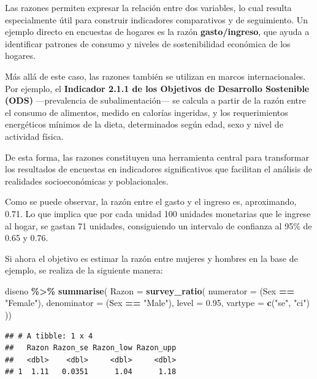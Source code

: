 \documentclass[
  spanish,
  12pt,
]{book}
\newenvironment{Shaded}{\begin{snugshade}}{\end{snugshade}}
\newcommand{\AttributeTok}[1]{\textcolor[rgb]{0.13,0.29,0.53}{#1}}
\newcommand{\FloatTok}[1]{\textcolor[rgb]{0.00,0.00,0.81}{#1}}
\newcommand{\FunctionTok}[1]{\textcolor[rgb]{0.13,0.29,0.53}{\textbf{#1}}}
\newcommand{\NormalTok}[1]{#1}
\newcommand{\SpecialCharTok}[1]{\textcolor[rgb]{0.81,0.36,0.00}{\textbf{#1}}}
\newcommand{\StringTok}[1]{\textcolor[rgb]{0.31,0.60,0.02}{#1}}
\begin{document}
Las razones permiten expresar la relación entre dos variables, lo cual resulta especialmente útil para construir indicadores comparativos y de seguimiento. Un ejemplo directo en encuestas de hogares es la razón \textbf{gasto/ingreso}, que ayuda a identificar patrones de consumo y niveles de sostenibilidad económica de los hogares.

Más allá de este caso, las razones también se utilizan en marcos internacionales. Por ejemplo, el \textbf{Indicador 2.1.1 de los Objetivos de Desarrollo Sostenible (ODS)} ---prevalencia de subalimentación--- se calcula a partir de la razón entre el consumo de alimentos, medido en calorías ingeridas, y los requerimientos energéticos mínimos de la dieta, determinados según edad, sexo y nivel de actividad física.

De esta forma, las razones constituyen una herramienta central para transformar los resultados de encuestas en indicadores significativos que facilitan el análisis de realidades socioeconómicas y poblacionales.

Como se puede observar, la razón entre el gasto y el ingreso es, aproximando, 0.71. Lo que implica que por cada unidad 100 unidades monetarias que le ingrese al hogar, se gastan 71 unidades, consiguiendo un intervalo de confianza al 95\% de 0.65 y 0.76.

Si ahora el objetivo es estimar la razón entre mujeres y hombres en la base de ejemplo, se realiza de la siguiente manera:

\begin{Shaded}
\begin{Highlighting}[]
\NormalTok{diseno }\SpecialCharTok{\%\textgreater{}\%} \FunctionTok{summarise}\NormalTok{(}
    \AttributeTok{Razon =}  \FunctionTok{survey\_ratio}\NormalTok{(}
      \AttributeTok{numerator =}\NormalTok{ (Sex }\SpecialCharTok{==} \StringTok{"Female"}\NormalTok{),}
      \AttributeTok{denominator =}\NormalTok{ (Sex }\SpecialCharTok{==} \StringTok{"Male"}\NormalTok{),}
      \AttributeTok{level =} \FloatTok{0.95}\NormalTok{,}
    \AttributeTok{vartype =}  \FunctionTok{c}\NormalTok{(}\StringTok{"se"}\NormalTok{, }\StringTok{"ci"}\NormalTok{)}
\NormalTok{    ))}
\end{Highlighting}
\end{Shaded}

\begin{verbatim}
## # A tibble: 1 x 4
##   Razon Razon_se Razon_low Razon_upp
##   <dbl>    <dbl>     <dbl>     <dbl>
## 1  1.11   0.0351      1.04      1.18
\end{verbatim}
\end{document}

